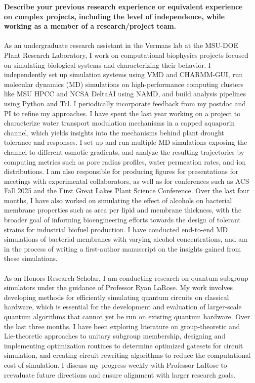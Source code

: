 \documentclass{article}
\begin{document}
\noindent\textbf{Describe your previous research experience or equivalent experience on complex projects, including the level of independence, while working as a member of a research/project team.}
\\\\
As an undergraduate research assistant in the Vermaas lab at the MSU-DOE Plant Research Laboratory, 
I work on computational biophysics projects focused on simulating biological systems and 
characterizing their behavior. I independently set up simulation systems using 
VMD and CHARMM-GUI, run molecular dynamics (MD) simulations on high-performance computing clusters 
like MSU HPCC and NCSA DeltaAI using NAMD, and build analysis pipelines using Python and 
Tcl. I periodically incorporate feedback from my postdoc and PI to refine my approaches.
I have spent the last year working on a project to characterize water transport modulation 
mechanisms in a capped aquaporin channel, which yields insights into the mechanisms behind 
plant drought tolerance and responses. I set up and run multiple MD simulations
exposing the channel to different osmotic gradients, and analyze the resulting trajectories
by computing metrics such as pore radius profiles, water permeation rates, and 
ion distributions. I am also responsible for producing figures for presentations for meetings 
with experimental collaborators, as well as for conferences such as ACS Fall 2025 and the 
First Great Lakes Plant Science Conference. Over the last four months, I have also worked 
on simulating the effect of alcohols on bacterial membrane properties such as area per lipid 
and membrane thickness, with the broader goal of 
informing bioengineering efforts towards the design of tolerant strains for industrial biofuel production. I have conducted 
end-to-end MD simulations of bacterial membranes with varying alcohol concentrations, and am in 
the process of writing a first-author manuscript on the insights gained from these simulations.
\\\\
As an Honors Research Scholar, I am conducting research on quantum subgroup simulators under the 
guidance of Professor Ryan LaRose. My work involves developing methods for efficiently simulating
quantum circuits on classical hardware, which is essential for the development and
evaluation of larger-scale quantum algorithms that cannot yet be run on existing quantum hardware.
Over the last three months, I have been exploring literature on group-theoretic and Lie-theoretic approaches to 
unitary subgroup membership, designing and implementing optimization routines to determine 
optimized gatesets for circuit simulation, and creating circuit rewriting algorithms to 
reduce the computational cost of simulation. I discuss my progress weekly with Professor LaRose
to reevaluate future directions and ensure alignment with larger research goals.
\end{document}
